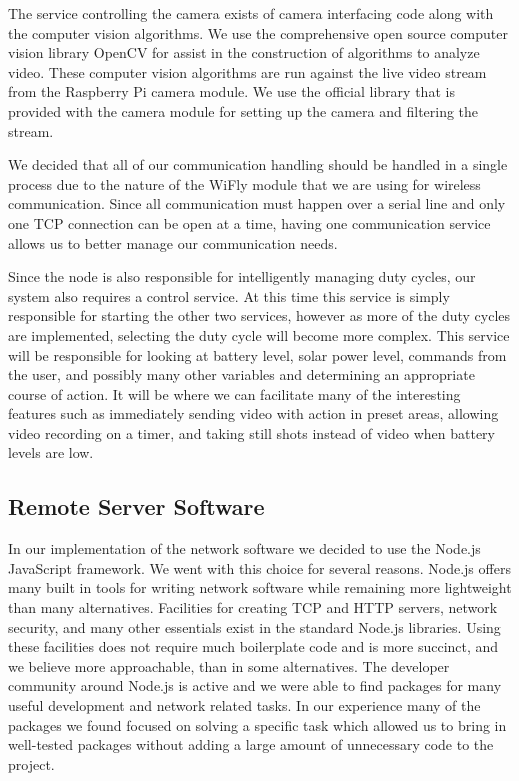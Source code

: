 The service controlling the camera exists of camera interfacing code along with
the computer vision algorithms. We use the comprehensive open source computer
vision library OpenCV for assist in the construction of algorithms to analyze
video. These computer vision algorithms are run against the live video stream
from the Raspberry Pi camera module. We use the official library that is
provided with the camera module for setting up the camera and filtering the
stream.

We decided that all of our communication handling should be handled in a single
process due to the nature of the WiFly module that we are using for wireless
communication. Since all communication must happen over a serial line and only
one TCP connection can be open at a time, having one communication service
allows us to better manage our communication needs.

Since the node is also responsible for intelligently managing duty cycles, our
system also requires a control service. At this time this service is simply
responsible for starting the other two services, however as more of the duty
cycles are implemented, selecting the duty cycle will become more complex. This
service will be responsible for looking at battery level, solar power level,
commands from the user, and possibly many other variables and determining an
appropriate course of action. It will be where we can facilitate many of the
interesting features such as immediately sending video with action in preset
areas, allowing video recording on a timer, and taking still shots instead of
video when battery levels are low.

\subsection{Remote Server Software}

In our implementation of the network software we decided to use the Node.js
JavaScript framework. We went with this choice for several reasons. Node.js
offers many built in tools for writing network software while remaining more
lightweight than many alternatives. Facilities for creating TCP and HTTP
servers, network security, and many other essentials exist in the standard
Node.js libraries. Using these facilities does not require much boilerplate code
and is more succinct, and we believe more approachable, than in some
alternatives. The developer community around Node.js is active and we were able
to find packages for many useful development and network related tasks. In our
experience many of the packages we found focused on solving a specific task
which allowed us to bring in well-tested packages without adding a large amount
of unnecessary code to the project.

